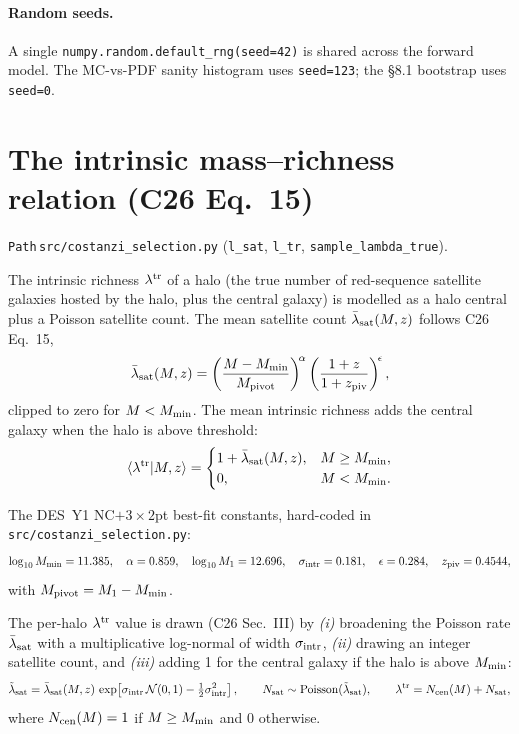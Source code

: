 \documentclass[a4paper, 11pt]{article}
\newcommand{\ltr}{\lambda^{\rm tr}}
\newcommand{\modname}[1]{\textcolor{kwcol}{\texttt{#1}}}
\newcommand{\pyfile}[1]{{\small\texttt{#1}}}
\begin{document}
\paragraph{Random seeds.} A single
\texttt{numpy.random.default\_rng(seed=42)} is shared across the forward
model. The MC-vs-PDF sanity histogram uses \texttt{seed=123}; the §8.1
bootstrap uses \texttt{seed=0}.

\section{The intrinsic mass--richness relation (C26 Eq.~15)}
\label{sec:mass-richness}

\modname{Path}\,\pyfile{src/costanzi\_selection.py}
(\texttt{l\_sat}, \texttt{l\_tr}, \texttt{sample\_lambda\_true}).

The intrinsic richness $\ltr$ of a halo (the true number of red-sequence
satellite galaxies hosted by the halo, plus the central galaxy) is
modelled as a halo central plus a Poisson satellite count. The mean
satellite count $\bar\lambda_{\rm sat}(M, z)$ follows C26 Eq.~15,
\begin{equation}
\label{eq:lsat}
  \bar\lambda_{\rm sat}(M, z)
  = \left( \frac{M - M_{\rm min}}{M_{\rm pivot}} \right)^{\!\alpha}
        \left( \frac{1+z}{1+z_{\rm piv}} \right)^{\!\epsilon},
\end{equation}
clipped to zero for $M < M_{\rm min}$. The mean intrinsic richness adds
the central galaxy when the halo is above threshold:
\begin{equation}
  \label{eq:ltr-mean}
  \langle\ltr | M, z\rangle =
  \begin{cases}
    1 + \bar\lambda_{\rm sat}(M, z), & M \ge M_{\rm min}, \\
    0,                                & M < M_{\rm min}.
  \end{cases}
\end{equation}

The DES~Y1 NC$+3{\times}2$pt best-fit constants, hard-coded in
\pyfile{src/costanzi\_selection.py}:
\begin{equation*}
  \log_{10} M_{\rm min} = 11.385,\quad
  \alpha = 0.859,\quad
  \log_{10} M_1 = 12.696,\quad
  \sigma_{\rm intr} = 0.181,\quad
  \epsilon = 0.284,\quad
  z_{\rm piv} = 0.4544,
\end{equation*}
with $M_{\rm pivot} = M_1 - M_{\rm min}$.

The per-halo $\ltr$ value is drawn (C26 Sec.~III) by
\textit{(i)} broadening the Poisson rate $\bar\lambda_{\rm sat}$ with a
multiplicative log-normal of width $\sigma_{\rm intr}$,
\textit{(ii)} drawing an integer satellite count, and
\textit{(iii)} adding 1 for the central galaxy if the halo is above
$M_{\rm min}$:
\begin{equation*}
  \tilde\lambda_{\rm sat} = \bar\lambda_{\rm sat}(M, z)\,
    \exp\!\left[\sigma_{\rm intr}\,\mathcal N(0, 1)
    - \tfrac{1}{2}\sigma_{\rm intr}^2\right],\qquad
  N_{\rm sat} \sim \mathrm{Poisson}(\tilde\lambda_{\rm sat}),\qquad
  \ltr = N_{\rm cen}(M) + N_{\rm sat},
\end{equation*}
where $N_{\rm cen}(M) = 1$ if $M \ge M_{\rm min}$ and $0$ otherwise.
\end{document}
